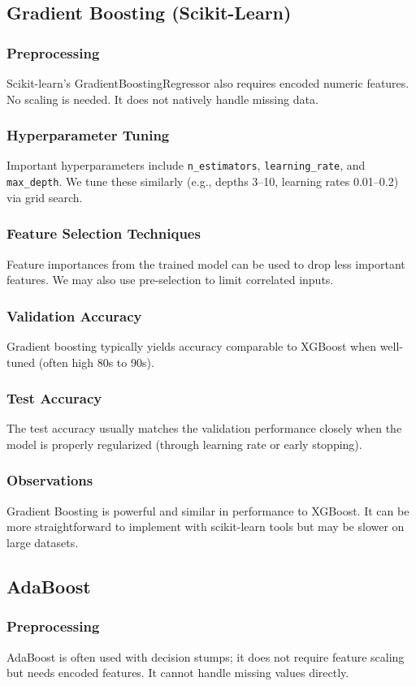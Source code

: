 \documentclass[12pt]{article}
\begin{document}
\subsection{Gradient Boosting (Scikit-Learn)}
\subsubsection{Preprocessing}
Scikit-learn's GradientBoostingRegressor also requires encoded numeric features. No scaling is needed. It does not natively handle missing data.
\subsubsection{Hyperparameter Tuning}
Important hyperparameters include \texttt{n\_estimators}, \texttt{learning\_rate}, and \texttt{max\_depth}. We tune these similarly (e.g., depths 3--10, learning rates 0.01--0.2) via grid search.
\subsubsection{Feature Selection Techniques}
Feature importances from the trained model can be used to drop less important features. We may also use pre-selection to limit correlated inputs.
\subsubsection{Validation Accuracy}
Gradient boosting typically yields accuracy comparable to XGBoost when well-tuned (often high 80s to 90s).
\subsubsection{Test Accuracy}
The test accuracy usually matches the validation performance closely when the model is properly regularized (through learning rate or early stopping).
\subsubsection{Observations}
Gradient Boosting is powerful and similar in performance to XGBoost. It can be more straightforward to implement with scikit-learn tools but may be slower on large datasets.

\subsection{AdaBoost}
\subsubsection{Preprocessing}
AdaBoost is often used with decision stumps; it does not require feature scaling but needs encoded features. It cannot handle missing values directly.
\end{document}
